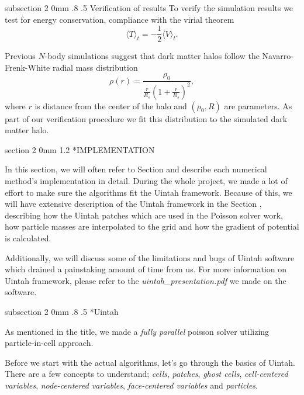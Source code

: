 \documentclass[notitlepage, 12pt]{article}
\makeatletter
\DeclareRobustCommand*{\nameref}[1]{%
      \emph{\myorg@nameref{#1}}%
    }%
\renewcommand{\section}{\@startsection       %
        {section}
        {2}
        {0mm}
        {1.2\baselineskip}
        {\baselineskip}
        {\centering\normalsize}}
\renewcommand{\subsection}{\@startsection    %
        {subsection}
        {2}
        {0mm}
        {.8\baselineskip}
        {.5\baselineskip}
        {\bfseries\normalsize}}
\makeatother
\begin{document}
\subsection{Verification of results}
To verify the simulation results we test for energy conservation, compliance with the virial theorem 
\begin{equation}
\langle T \rangle_t = -\frac{1}{2}\langle V \rangle_t.
\end{equation}

Previous $N$-body simulations suggest that dark matter halos follow the Navarro-Frenk-White radial mass distribution 
\begin{equation}
\rho(r) = \frac{\rho_0}{\frac{r}{R_s}\left(1 + \frac{r}{R_s}\right)^2},
\end{equation}
where $r$ is distance from the center of the halo and $(\rho_0,R)$ are parameters. As part of our verification procedure we fit this distribution to the simulated dark matter halo.

\section*{IMPLEMENTATION}

In this section, we will often refer to Section \nameref{ssec:numerical} and describe each numerical method's implementation in detail. During the whole 
project, we made a lot of effort to make sure the algorithms fit the Uintah framework. Because of this, we will have extensive description of 
the Uintah framework in the Section \nameref{ssec:Uintah}, describing how the Uintah patches which are used in the Poisson solver work, 
how particle masses are interpolated to the grid and how the gradient of potential is calculated. 

Additionally, we will discuss some of the limitations and 
bugs of Uintah software which drained a painstaking amount of time from us. For more information on Uintah framework, please refer to the \emph{uintah\_presentation.pdf} 
we made on the software.

\subsection*{Uintah} \label{ssec:Uintah}

As mentioned in the title, we made a \emph{fully parallel} poisson solver utilizing particle-in-cell approach.

Before we start with the actual algorithms, let's go through the basics of Uintah. There are a few concepts to understand; \emph{cells}, \emph{patches}, 
\emph{ghost cells}, \emph{cell-centered variables}, \emph{node-centered variables}, \emph{face-centered variables} and \emph{particles}. 
\end{document}
